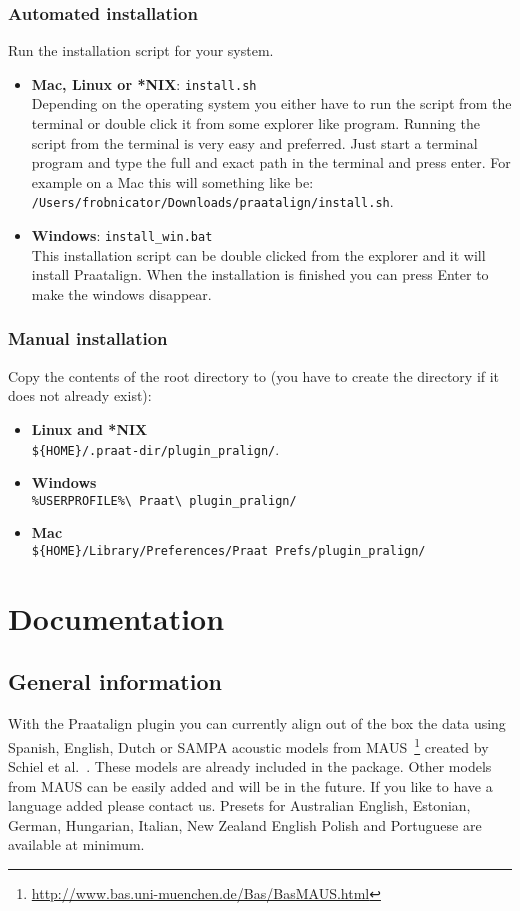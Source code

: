 \subsection{Automated installation}
Run the installation script for your system.
\begin{itemize}
	\item \textbf{Mac, Linux or *NIX}: \texttt{install.sh}\\
		Depending on the operating system you either have to run the script from
		the terminal or double click it from some explorer like program. Running
		the script from the terminal is very easy and preferred. Just start a
		terminal program and type the full and exact path in the terminal and press
		enter. For example on a Mac this will something like be:\\
		\texttt{/Users/frobnicator/Downloads/praatalign/install.sh}.
	\item \textbf{Windows}: \texttt{install\_win.bat}\\
		This installation script can be double clicked from the explorer and it
		will install Praatalign. When the installation is finished you can press
		Enter to make the windows disappear.
\end{itemize}

\subsection{Manual installation}
Copy the contents of the root directory to (you have to create the directory if
it does not already exist):
\begin{itemize}
	\item \textbf{Linux and *NIX}\\
		\texttt{\$\{HOME\}/.praat-dir/plugin\_pralign/}.
	\item \textbf{Windows}\\
		\texttt{\%USERPROFILE\%\textbackslash{} Praat\textbackslash{} plugin\_pralign/}
	\item \textbf{Mac}\\
		\texttt{\$\{HOME\}/Library/Preferences/Praat Prefs/plugin\_pralign/}
\end{itemize}

\chapter{Documentation}
\section{General information}
With the Praatalign plugin you can currently align out of the box the data
using Spanish, English, Dutch or SAMPA acoustic models from
MAUS~\footnote{\url{http://www.bas.uni-muenchen.de/Bas/BasMAUS.html}} created
by Schiel et al.~\cite{schiel1999}. These models are already included in the
package. Other models from MAUS can be easily added and will be in the future.
If you like to have a language added please contact us.
Presets for Australian English, Estonian, German, Hungarian, Italian, New
Zealand English Polish and Portuguese are available at minimum.

